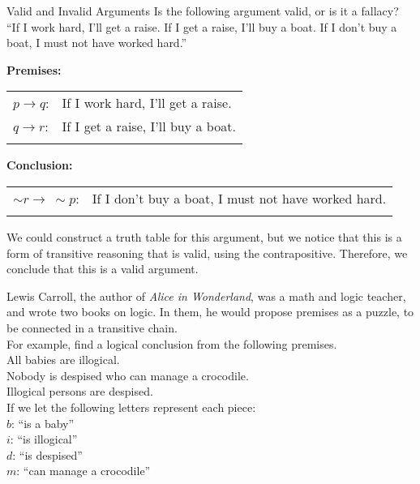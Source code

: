 \begin{example}[https://www.youtube.com/watch?v=IbjD73wapPs]{Valid and Invalid Arguments}
Is the following argument valid, or is it a fallacy?\\

``If I work hard, I'll get a raise.  If I get a raise, I'll buy a boat.  If I don't buy a boat, I must not have worked hard.''

\sol
\textbf{Premises:}\\
\begin{tabular}{l l}
$p \to q$: & If I work hard, I'll get a raise.\\
$q \to r$: & If I get a raise, I'll buy a boat.\\
& \\
\end{tabular}

\textbf{Conclusion:}\\
\begin{tabular}{l l}
$\sim r \to\ \sim p$: & If I don't buy a boat, I must not have worked hard.\\
&
\end{tabular}

We could construct a truth table for this argument, but we notice that this is a form of transitive reasoning that is valid, using the contrapositive.  Therefore, we conclude that this is a valid argument.
\end{example}

Lewis Carroll, the author of \textit{Alice in Wonderland}, was a math and logic teacher, and wrote two books on logic.  In them, he would propose premises as a puzzle, to be connected in a transitive chain.\\

For example, find a logical conclusion from the following premises.\\
All babies are illogical.\\
Nobody is despised who can manage a crocodile.\\
Illogical persons are despised.\\

\noindent If we let the following letters represent each piece:\\
$b$: ``is a baby''\\
$i$: ``is illogical''\\
$d$: ``is despised''\\
$m$: ``can manage a crocodile''\\

